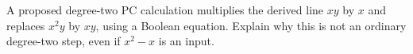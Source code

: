 \begin{exercise}\label{tx:ex:Boolean-rule}
A proposed degree-two PC calculation multiplies the derived line $xy$
by $x$ and replaces $x^2y$ by $xy$, using a Boolean equation. Explain
why this is not an ordinary degree-two step, even if $x^2-x$ is an input.
\end{exercise}
\par\medskip

